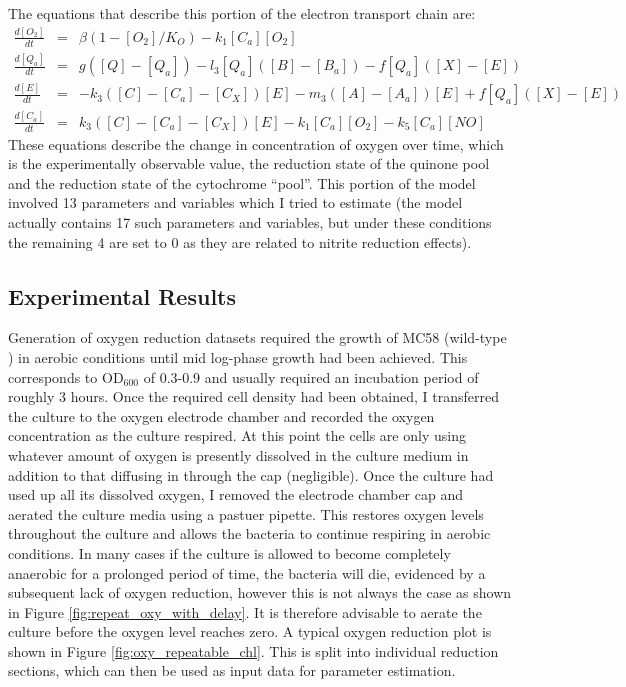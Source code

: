 The equations that describe this portion of the electron transport chain are:
\begin{eqnarray*}
\frac{d[O_2]}{dt} & = & \beta(1-[O_2]/K_O) - k_{1}[C_a][O_2]\\
\frac{d[Q_a]}{dt} & = & g([Q] - [Q_a]) - l_3[Q_a]([B] - [B_a]) - f[Q_a]([X]-[E])\\
\frac{d[E]}{dt} & = & -k_3([C] - [C_a] - [C_X])[E]  - m_3([A] - [A_a])[E] + f[Q_a]([X]-[E])\\
\frac{d[C_a]}{dt} & = & k_3([C] - [C_a] - [C_X])[E] - k_{1}[C_a][O_2] - k_5[C_a][NO]
\end{eqnarray*}
These equations describe the change in concentration of oxygen over time, which is the experimentally observable value, the reduction state of the quinone pool and the reduction state of the cytochrome ``pool''. This portion of the model involved 13 parameters and variables which I tried to estimate (the model actually contains 17 such parameters and variables, but under these conditions the remaining 4 are set to 0 as they are related to nitrite reduction effects).

\subsection{Experimental Results}

Generation of oxygen reduction datasets required the growth of MC58 (wild-type \Nsm{}) in aerobic conditions until mid log-phase growth had been achieved. This corresponds to $\mathrm{OD}_{600}$ of 0.3-0.9 and usually required an incubation period of roughly 3 hours. Once the required cell density had been obtained, I transferred the culture to the oxygen electrode chamber and recorded the oxygen concentration as the culture respired. At this point the cells are only using whatever amount of oxygen is presently dissolved in the culture medium in addition to that diffusing in through the cap (negligible). Once the culture had used up all its dissolved oxygen, I removed the electrode chamber cap and aerated the culture media using a pastuer pipette. This restores oxygen levels throughout the culture and allows the bacteria to continue respiring in aerobic conditions. In many cases if the culture is allowed to become completely anaerobic for a prolonged period of time, the bacteria will die, evidenced by a subsequent lack of oxygen reduction, however this is not always the case as shown in Figure \ref{fig:repeat_oxy_with_delay}. It is therefore advisable to aerate the culture before the oxygen level reaches zero. A typical oxygen reduction plot is shown in Figure \ref{fig:oxy_repeatable_chl}. This is split into individual reduction sections, which can then be used as input data for parameter estimation.


